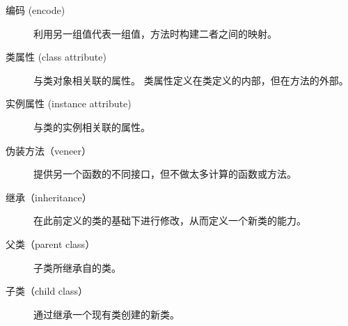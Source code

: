 \begin{description}


\item[编码 (encode)]  利用另一组值代表一组值，方法时构建二者之间的映射。


\item[类属性 (class attribute)]  与类对象相关联的属性。  类属性定义在类定义的内部，但在方法的外部。  


\item[实例属性 (instance attribute)]  与类的实例相关联的属性。


\item[伪装方法（veneer）]  提供另一个函数的不同接口，但不做太多计算的函数或方法。


\item[继承（inheritance）]  在此前定义的类的基础下进行修改，从而定义一个新类的能力。


\item[父类（parent class）]  子类所继承自的类。


\item[子类（child class）]  通过继承一个现有类创建的新类。


\end{description}
